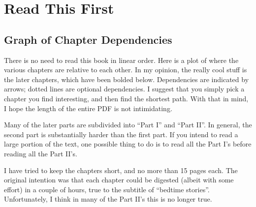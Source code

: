 \addtocounter{chapter}{-1}
\chapter{Read This First}
\section{Graph of Chapter Dependencies}
There is no need to read this book in linear order.
Here is a plot of where the various chapters are relative to each other.
In my opinion, the really cool stuff is the later chapters,
which have been bolded below.
Dependencies are indicated by arrows;
dotted lines are optional dependencies.
I suggest that you simply pick a chapter you find interesting,
and then find the shortest path.
With that in mind, I hope the length of the entire PDF is not intimidating.

Many of the later parts are subdivided into ``Part I'' and ``Part II''.
In general, the second part is substantially harder than the first part.
If you intend to read a large portion of the text,
one possible thing to do is to read all the Part I's
before reading all the Part II's.

I have tried to keep the chapters short, and no more than 15 pages each.
The original intention was that each chapter could be digested
(albeit with some effort) in a couple of hours,
true to the subtitle of ``bedtime stories''.
Unfortunately, I think in many of the Part II's this is no longer true.



\eject

